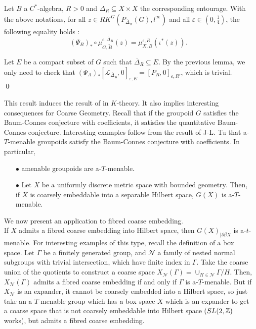 \begin{thm}\label{BCCeq}
Let $B$ a $C^*$-algebra, $R>0$ and $\Delta_R\subseteq X\times X$ the corresponding entourage. With the above notations, for all $z\in RK^G(P_{\overline \Delta_R}(G),l^\infty)$ and all $\varepsilon\in(0,\frac{1}{4})$, the following equality holds :
\[(\Psi_B)_*\circ\mu^{\epsilon,\overline\Delta_R}_{G,\tilde B} (z) = \mu_{X,B}^{\epsilon,R}(\iota^*(z)).\]
\end{thm}

\begin{dem}
Let $E$ be a compact subset of $G$ such that $\overline \Delta_R \subseteq E$.
By the previous lemma, we only need to check that $(\Psi_A)_*[\mathcal L_{\overline \Delta_R},0]_{\varepsilon,E} = [P_R,0]_{\varepsilon, R'} $, which is trivial.\\
\qed
\end{dem}

This result induces the result of \cite{SkTuYu} in $K$-theory. It also implies interesting consequences for Coarse Geometry. Recall that if the groupoid $G$ satisfies the Baum-Connes conjecture with coefficients, it satisfies the quantitative Baum-Connes conjecture. Interesting examples follow from the result of J-L. Tu \cite{TuThese} that a-$T$-menable groupoids satisfy the Baum-Connes conjecture with coefficients. In particular, \\

\begin{itemize}
\item[$\bullet$] amenable groupoids are a-$T$-menable.\\
\item[$\bullet$] Let $X$ be a uniformly discrete metric space with bounded geometry. Then, if $X$ is coarsely embeddable into a separable Hilbert space, $G(X)$ is a-$T$-menable.\cite{SkTuYu} \\
\end{itemize}

We now present an application to fibred coarse embedding.\\

If $X$ admits a fibred coarse embedding into Hilbert space, then $G(X)_{|\partial \beta X}$ is a-$t$-menable.\cite{FinnSellFibred} For interesting examples of this type, recall the definition of a box space. Let $\Gamma$ be a finitely generated group, and $\mathcal N$ a family of nested normal subgroups with trivial intersection, which have finite index in $\Gamma$. Take the coarse union of the quotients to construct a coarse space $X_{\mathcal N}(\Gamma)= \cup_{H\in \mathcal N } \Gamma/ H$. Then, $X_{\mathcal N}(\Gamma)$ admits a fibred coarse embedding if and only if $\Gamma$ is a-$T$-menable. But if $X_{\mathcal N}$ is an expander, it cannot be coarsely embedded into a Hilbert space, so just take an a-$T$-menable group which has a box space $X$ which is an expander to get a coarse space that is not coarsely embeddable into Hilbert space ($SL(2,\mathbb Z)$ works), but admits a fibred coarse embedding.\\

